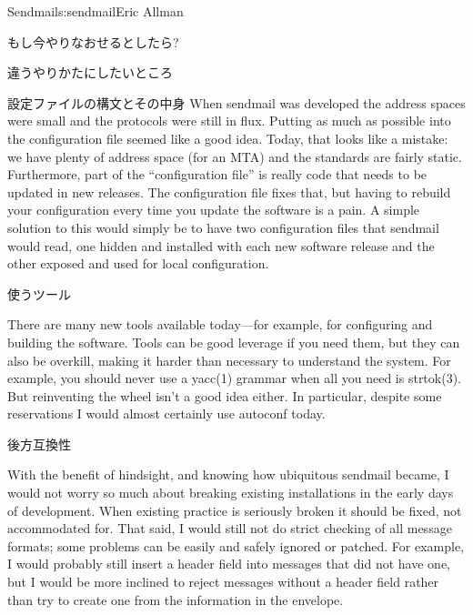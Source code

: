 \begin{aosachapter}{Sendmail}{s:sendmail}{Eric Allman}
\begin{aosasect1}{もし今やりなおせるとしたら?}
\begin{aosasect2}{違うやりかたにしたいところ}
\begin{aosasect3}{設定ファイルの構文とその中身}
When sendmail was developed the address spaces were small and the
protocols were still in flux. Putting as much as possible into the
configuration file seemed like a good idea. Today, that looks like a
mistake: we have plenty of address space (for an MTA) and the
standards are fairly static.
Furthermore, part of the ``configuration file'' is really code
that needs to be updated in new releases.
The  configuration file fixes that,
but having to rebuild your configuration every time you update the software
is a pain.
A simple solution to this would simply be
to have two configuration files that sendmail would read, one hidden
and installed with each new software release and the other exposed and
used for local configuration.

\end{aosasect3}

\begin{aosasect3}{使うツール}

There are many new tools available today---for example, for
configuring and building the software. Tools can be good leverage if
you need them, but they can also be overkill, making it harder than
necessary to understand the system. For example, you should never use
a yacc(1) grammar when all you need is strtok(3). But reinventing the
wheel isn't a good idea either.  In particular, despite some
reservations I would almost certainly use autoconf today.

\end{aosasect3}

\begin{aosasect3}{後方互換性}

With the benefit of hindsight, and knowing how ubiquitous sendmail
became, I would not worry so much about breaking existing
installations in the early days of development.  When existing
practice is seriously broken it should be fixed, not accommodated
for. That said, I would still not do strict checking of all message
formats; some problems can be easily and safely ignored or
patched. For example, I would probably still insert a 
header field into messages that did not have one, but I would be more
inclined to reject messages without a  header field rather than
try to create one from the information in the envelope.

\end{aosasect3}


\end{aosasect2}
\end{aosasect1}
\end{aosachapter}
